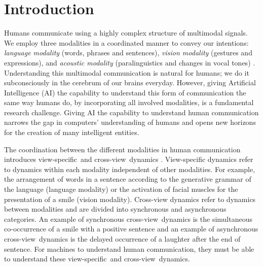 \documentclass[letterpaper]{article} \usepackage{aaai18}  \usepackage{times}  \usepackage{helvet}  \usepackage{courier}  \usepackage{url}  \usepackage{graphicx}  \usepackage{multirow}
\newcommand{\intra}{view-specific}
\newcommand{\inter}{cross-view}
\begin{document}
\section{Introduction}
Humans communicate using a highly complex structure of multimodal signals. We employ three modalities in a coordinated manner to convey our intentions: \textit{language modality} (words, phrases and sentences), \textit{vision modality} (gestures and expressions), and \textit{acoustic modality} (paralinguistics and changes in vocal tones) \cite{morency2011towards}. Understanding this multimodal communication is natural for humans; we do it subconsciously in the cerebrum of our brains everyday. However, giving Artificial Intelligence (AI) the capability to understand this form of communication the same way humans do, by incorporating all involved modalities, is a fundamental research challenge. Giving AI the capability to understand human communication narrows the gap in computers' understanding of humans and opens new horizons for the creation of many intelligent entities.

The coordination between the different modalities in human communication introduces \intra \ and \inter \ dynamics \cite{tensoremnlp17}. View-specific dynamics refer to dynamics within each modality independent of other modalities. For example, the arrangement of words in a sentence according to the generative grammar of the language (language modality) or the activation of facial muscles for the presentation of a smile (vision modality). Cross-view dynamics refer to dynamics between modalities and are divided into synchronous and asynchronous categories. An example of synchronous \inter \ dynamics is the simultaneous co-occurrence of a smile with a positive sentence and an example of asynchronous \inter \ dynamics is the delayed occurrence of a laughter after the end of sentence. For machines to understand human communication, they must be able to understand these \intra \ and \inter \ dynamics. 
\end{document}
